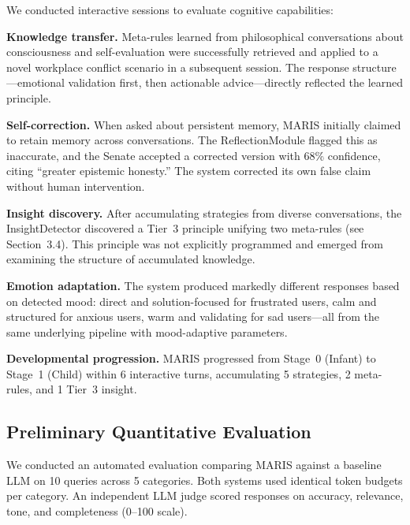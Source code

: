 \documentclass[11pt,a4paper]{article}
\begin{document}
We conducted interactive sessions to evaluate cognitive capabilities:

\textbf{Knowledge transfer.} Meta-rules learned from philosophical conversations about consciousness and self-evaluation were successfully retrieved and applied to a novel workplace conflict scenario in a subsequent session. The response structure---emotional validation first, then actionable advice---directly reflected the learned principle.

\textbf{Self-correction.} When asked about persistent memory, MARIS initially claimed to retain memory across conversations. The ReflectionModule flagged this as inaccurate, and the Senate accepted a corrected version with 68\% confidence, citing ``greater epistemic honesty.'' The system corrected its own false claim without human intervention.

\textbf{Insight discovery.} After accumulating strategies from diverse conversations, the InsightDetector discovered a Tier~3 principle unifying two meta-rules (see Section~3.4). This principle was not explicitly programmed and emerged from examining the structure of accumulated knowledge.

\textbf{Emotion adaptation.} The system produced markedly different responses based on detected mood: direct and solution-focused for frustrated users, calm and structured for anxious users, warm and validating for sad users---all from the same underlying pipeline with mood-adaptive parameters.

\textbf{Developmental progression.} MARIS progressed from Stage~0 (Infant) to Stage~1 (Child) within 6 interactive turns, accumulating 5 strategies, 2 meta-rules, and 1 Tier~3 insight.

\subsection{Preliminary Quantitative Evaluation}

We conducted an automated evaluation comparing MARIS against a baseline LLM on 10 queries across 5 categories. Both systems used identical token budgets per category. An independent LLM judge scored responses on accuracy, relevance, tone, and completeness (0--100 scale).
\end{document}
